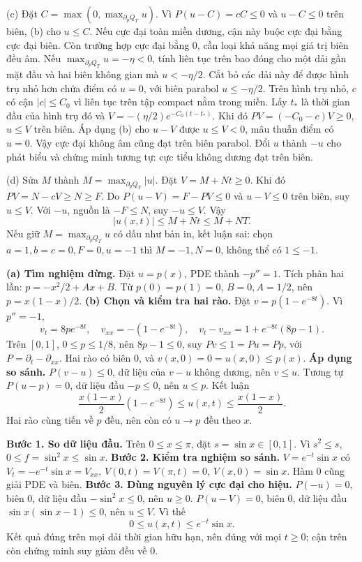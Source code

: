 (c) Đặt $C=\max(0,\max_{\partial_pQ_T}u)$. Vì $P(u-C)=cC\le0$ và $u-C\le0$ trên biên, (b) cho $u\le C$. Nếu cực đại toàn miền dương, cận này buộc cực đại bằng cực đại biên. Còn trường hợp cực đại bằng $0$, cần loại khả năng mọi giá trị biên đều âm.
Nếu $\max_{\partial_pQ_T}u=-\eta<0$, tính liên tục trên bao đóng cho một dải gần mặt đầu và hai biên không gian mà $u<-\eta/2$. Cắt bỏ các dải này để được hình trụ nhỏ hơn chứa điểm có $u=0$, với biên parabol $u\le-\eta/2$. Trên hình trụ nhỏ, $c$ có cận $|c|\le C_0$ vì liên tục trên tập compact nằm trong miền. Lấy $t_*$ là thời gian đầu của hình trụ đó và $V=-(\eta/2)e^{-C_0(t-t_*)}$. Khi đó $PV=(-C_0-c)V\ge0$, $u\le V$ trên biên. Áp dụng (b) cho $u-V$ được $u\le V<0$, mâu thuẫn điểm có $u=0$. Vậy cực đại không âm cũng đạt trên biên parabol. Đổi $u$ thành $-u$ cho phát biểu và chứng minh tương tự: cực tiểu không dương đạt trên biên.

(d) Sửa $M$ thành $M=\max_{\partial_pQ_T}|u|$. Đặt $V=M+Nt\ge0$. Khi đó $PV=N-cV\ge N\ge F$. Do $P(u-V)=F-PV\le0$ và $u-V\le0$ trên biên, suy $u\le V$. Với $-u$, nguồn là $-F\le N$, suy $-u\le V$. Vậy
\[|u(x,t)|\le M+Nt\le M+NT.\]
Nếu giữ $M=\max_{\partial_pQ_T}u$ có dấu như bản in, kết luận sai: chọn $a=1,b=c=0,F=0,u=-1$ thì $M=-1,N=0$, không thể có $1\le-1$.

\textbf{(a) Tìm nghiệm dừng.} Đặt $u=p(x)$, PDE thành $-p''=1$. Tích phân hai lần: $p=-x^2/2+Ax+B$. Từ $p(0)=p(1)=0$, $B=0,A=1/2$, nên $p=x(1-x)/2$.
\textbf{(b) Chọn và kiểm tra hai rào.} Đặt $v=p(1-e^{-8t})$. Vì $p''=-1$,
\[v_t=8pe^{-8t},\quad v_{xx}=-(1-e^{-8t}),\quad
v_t-v_{xx}=1+e^{-8t}(8p-1).\]
Trên $[0,1]$, $0\le p\le1/8$, nên $8p-1\le0$, suy $Pv\le1=Pu= Pp$, với $P=\partial_t-\partial_{xx}$. Hai rào có biên $0$, và $v(x,0)=0=u(x,0)\le p(x)$.
\textbf{Áp dụng so sánh.} $P(v-u)\le0$, dữ liệu của $v-u$ không dương, nên $v\le u$. Tương tự $P(u-p)=0$, dữ liệu đầu $-p\le0$, nên $u\le p$. Kết luận
\[\frac{x(1-x)}2(1-e^{-8t})\le u(x,t)\le\frac{x(1-x)}2.\]
Hai rào cùng tiến về $p$ đều, nên còn có $u\to p$ đều theo $x$.

\textbf{Bước 1. So dữ liệu đầu.} Trên $0\le x\le\pi$, đặt $s=\sin x\in[0,1]$. Vì $s^2\le s$, $0\le f=\sin^2x\le\sin x$.
\textbf{Bước 2. Kiểm tra nghiệm so sánh.} $V=e^{-t}\sin x$ có $V_t=-e^{-t}\sin x=V_{xx}$, $V(0,t)=V(\pi,t)=0$, $V(x,0)=\sin x$. Hàm $0$ cũng giải PDE và biên.
\textbf{Bước 3. Dùng nguyên lý cực đại cho hiệu.} $P(-u)=0$, biên $0$, dữ liệu đầu $-\sin^2x\le0$, nên $u\ge0$. $P(u-V)=0$, biên $0$, dữ liệu đầu $\sin x(\sin x-1)\le0$, nên $u\le V$. Vì thế
\[0\le u(x,t)\le e^{-t}\sin x.\]
Kết quả đúng trên mọi dải thời gian hữu hạn, nên đúng với mọi $t\ge0$; cận trên còn chứng minh suy giảm đều về $0$.

